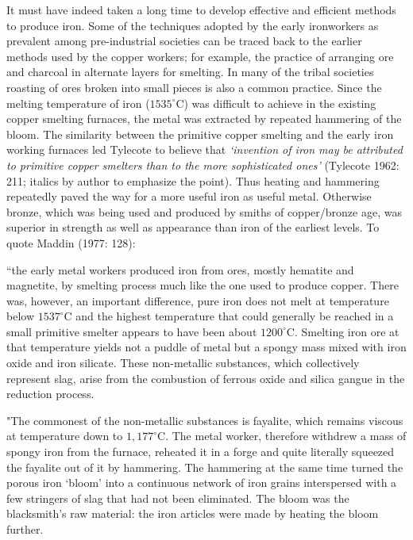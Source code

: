 It must have indeed taken a long time to develop effective and efficient methods to produce iron. Some of the techniques adopted by the early ironworkers as prevalent among pre-industrial societies can be traced back to the earlier methods used by the copper workers; for example, the practice of arranging ore and charcoal in alternate layers for smelting. In many of the tribal societies roasting of ores broken into small pieces is also a common practice. Since the melting temperature of iron ($1535^{\circ}$C) was difficult to achieve in the existing copper smelting furnaces, the metal was extracted by repeated hammering of the bloom. The similarity between the primitive copper smelting and the early iron working furnaces led Tylecote to believe that \textit{`invention of iron may be attributed to primitive copper smelters than to the more sophisticated ones'} (Tylecote 1962: 211; italics by author to emphasize the point). Thus heating and hammering repeatedly paved the way for a more useful iron as useful metal. Otherwise bronze, which was being used and produced by smiths of copper/bronze age, was superior in strength as well as appearance than iron of the earliest levels. To quote Maddin (1977: 128): 


{\footnotesize “the early metal workers produced iron from ores, mostly hematite and magnetite, by smelting process much like the one used to produce copper. There was, however, an important difference, pure iron does not melt at temperature below $1537^{\circ}$C and the highest temperature that could generally be reached in a small primitive smelter appears to have been about $1200^{\circ}$C. Smelting iron ore at that temperature yields not a puddle of metal but a spongy mass mixed with iron oxide and iron silicate. These non-metallic substances, which collectively represent slag, arise from the combustion of ferrous oxide and silica gangue in the reduction process.}

{\footnotesize "The commonest of the non-metallic substances is fayalite, which remains viscous at temperature down to $1,177^{\circ}$C. The metal worker, therefore withdrew a mass of spongy iron from the furnace, reheated it in a forge and quite literally squeezed the fayalite out of it by hammering. The hammering at the same time turned the porous iron ‘bloom’ into a continuous network of iron grains interspersed with a few stringers of slag that had not been eliminated. The bloom was the blacksmith’s raw material: the iron articles were made by heating the bloom further.}

